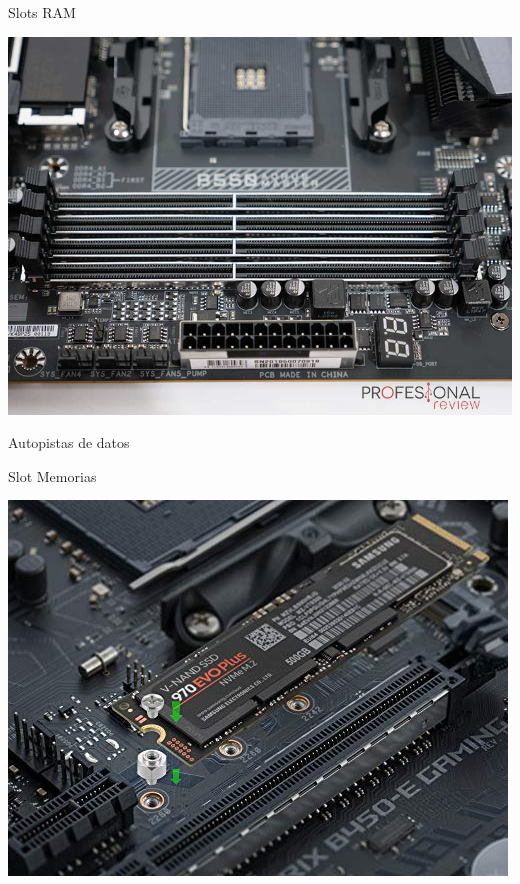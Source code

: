 \documentclass[10pt,xcolor={dvipsnames}]{beamer}
\begin{document}
\begin{frame}{Slots RAM}
\begin{center}
\includegraphics[scale=0.35]{Figures/SlotsRAM}
\end{center}
\end{frame}

\begin{frame}{Autopistas de datos}
\begin{center}
\end{center}
\end{frame}

\begin{frame}{Slot Memorias}
\begin{center}
\includegraphics[scale=0.5]{Figures/SlotMemoria}
\end{center}
\end{frame}
\end{document}
